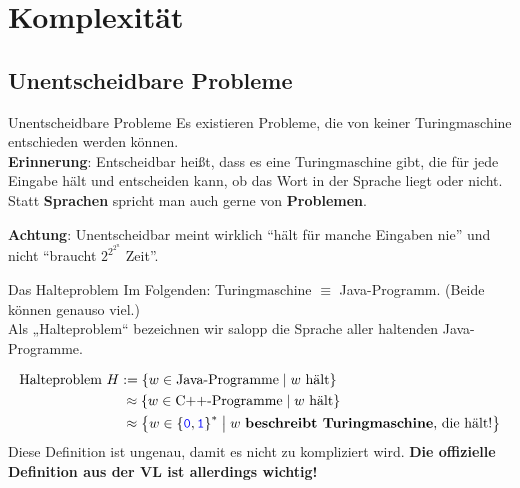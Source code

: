 \section{Komplexität}

\subsection{Unentscheidbare Probleme}
\begin{frame}{Unentscheidbare Probleme}
	Es existieren Probleme, die von keiner Turingmaschine entschieden werden können.\\ \pause
	\textbf{Erinnerung}: Entscheidbar heißt, dass es eine Turingmaschine gibt, die für jede Eingabe hält und entscheiden kann, ob das Wort in der Sprache liegt oder nicht. Statt \textbf{Sprachen} spricht man auch gerne von \textbf{Problemen}.\\ \pause
	
	\bigskip
	\textbf{Achtung}: Unentscheidbar meint wirklich \enquote{hält für manche Eingaben nie} und nicht \enquote{braucht $2^{2^{2^{n}}}$ Zeit}.
\end{frame}

\begin{frame}{Das Halteproblem}
	Im Folgenden: Turingmaschine $\equiv$ Java-Programm. {\small (Beide können genauso viel.)}\\ \pause
	\bigskip
	Als „Halteproblem“ bezeichnen wir salopp die Sprache aller haltenden Java-Programme.
	\begin{Definition} 
		\vspace{-1.5\baselineskip}
		\begin{align*}
		\text{Halteproblem } H &:= \left\{w \in \text{Java-Programme} \;\middle|\; w \text{ hält}\right\} \\
		&\:\approx \left\{w \in \text{C++-Programme} \;\middle|\; w \text{ hält}\right\} \\
		&\:\approx \left\{w \in \left\{\hbox{\textcolor{blue}{\texttt{0}}}, \hbox{\textcolor{blue}{\texttt{1}}}\right\}^* \;\middle|\; w \text{ \textbf{beschreibt Turingmaschine}, die hält!}\right\}
		\end{align*}
		Diese Definition ist ungenau, damit es nicht zu kompliziert wird. \textbf{Die offizielle Definition aus der VL ist allerdings wichtig!}
	\end{Definition}
\end{frame}

